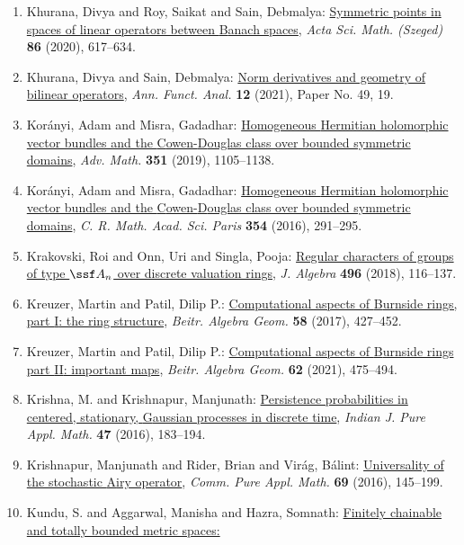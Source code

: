 \begin{enumerate}
\item Khurana, Divya and Roy, Saikat and Sain, Debmalya: \href{https://doi.org/10.14232/actasm-020-420-6}{Symmetric points in spaces of linear operators between
{B}anach spaces}, \emph{Acta Sci. Math. (Szeged)} {\bf 86} (2020), 617--634.
\item Khurana, Divya and Sain, Debmalya: \href{https://doi.org/10.1007/s43034-021-00134-9}{Norm derivatives and geometry of bilinear operators}, \emph{Ann. Funct. Anal.} {\bf 12} (2021), Paper No. 49, 19.
\item Kor\'{a}nyi, Adam and Misra, Gadadhar: \href{https://doi.org/10.1016/j.aim.2019.05.018}{Homogeneous {H}ermitian holomorphic vector bundles and the
{C}owen-{D}ouglas class over bounded symmetric domains}, \emph{Adv. Math.} {\bf 351} (2019), 1105--1138.
\item Kor\'{a}nyi, Adam and Misra, Gadadhar: \href{https://doi.org/10.1016/j.crma.2015.11.002}{Homogeneous {H}ermitian holomorphic vector bundles and the
{C}owen-{D}ouglas class over bounded symmetric domains}, \emph{C. R. Math. Acad. Sci. Paris} {\bf 354} (2016), 291--295.
\item Krakovski, Roi and Onn, Uri and Singla, Pooja: \href{https://doi.org/10.1016/j.jalgebra.2017.10.018}{Regular characters of groups of type {$\ssf A_n$} over
discrete valuation rings}, \emph{J. Algebra} {\bf 496} (2018), 116--137.
\item Kreuzer, Martin and Patil, Dilip P.: \href{https://doi.org/10.1007/s13366-016-0324-4}{Computational aspects of {B}urnside rings, part {I}: the ring
structure}, \emph{Beitr. Algebra Geom.} {\bf 58} (2017), 427--452.
\item Kreuzer, Martin and Patil, Dilip P.: \href{https://doi.org/10.1007/s13366-020-00520-9}{Computational aspects of {B}urnside rings part {II}: important
maps}, \emph{Beitr. Algebra Geom.} {\bf 62} (2021), 475--494.
\item Krishna, M. and Krishnapur, Manjunath: \href{https://doi.org/10.1007/s13226-016-0183-6}{Persistence probabilities in centered, stationary, {G}aussian
processes in discrete time}, \emph{Indian J. Pure Appl. Math.} {\bf 47} (2016), 183--194.
\item Krishnapur, Manjunath and Rider, Brian and Vir\'{a}g, B\'{a}lint: \href{https://doi.org/10.1002/cpa.21573}{Universality of the stochastic {A}iry operator}, \emph{Comm. Pure Appl. Math.} {\bf 69} (2016), 145--199.
\item Kundu, S. and Aggarwal, Manisha and Hazra, Somnath: \href{https://doi.org/10.1016/j.topol.2016.11.008}{Finitely chainable and totally bounded metric spaces:
}
\end{enumerate}

